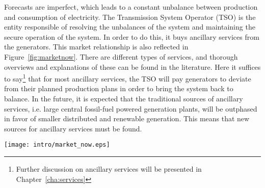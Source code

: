 Forecasts are imperfect, which leads to a constant unbalance between production and consumption of electricity. The Transmission System Operator (TSO) is the entity responsible of resolving the unbalances of the system and maintaining the secure operation of the system. In order to do this, it buys ancillary services from the generators. This market relationship is also reflected in Figure~\ref{fig:marketnow}. There are different types of services, and thorough overviews and explanations of these can be found in the literature. Here it suffices to say\footnote{Further discussion on ancillary services will be presented in Chapter~\ref{cha:services}} that for most ancillary services, the TSO will pay generators to deviate from their planned production plans in order to bring the system back to balance. In the future, it is expected that the traditional sources of ancillary services, i.e. large central fossil-fuel powered generation plants, will be outphased in favor of smaller distributed and renewable generation. This means that new sources for ancillary services must be found.
\begin{figure*}[hbp!]
		\centering
	\caption{The actors and relationships in the power market today. Note that the consumer buys electricity from a retailer, but has no further contact to the other market actors, i.e. the consumer has a passive role in the system.}\label{fig:marketnow}
	\texttt{[image: intro/market\_now.eps]}
\end{figure*}
